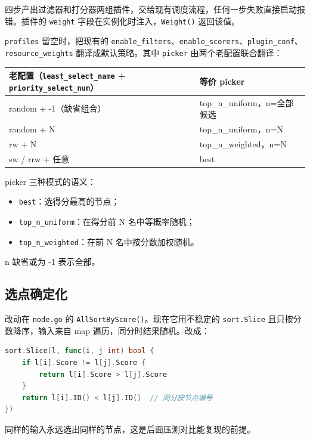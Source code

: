 \documentclass[UTF8,fontset=none,zihao=-4]{ctexart}
\newcommand{\code}[1]{\colorbox{gray!12}{\texttt{#1}}}
\begin{document}
四步产出过滤器和打分器两组插件，交给现有调度流程，任何一步失败直接启动报错。插件的 \code{weight} 字段在实例化时注入，\code{Weight()} 返回该值。

\code{profiles} 留空时，把现有的 \code{enable\_filters}、\code{enable\_scorers}、\code{plugin\_conf}、\code{resource\_weights} 翻译成默认策略。其中 \code{picker} 由两个老配置联合翻译：

\begin{table}[H]
\centering\small
\begin{tabularx}{\textwidth}{L{0.55\textwidth}L{0.45\textwidth}}
\toprule
\textbf{老配置（\code{least\_select\_name} + \code{priority\_select\_num}）} & \textbf{等价 picker} \\
\midrule
random + -1（缺省组合） & top\_n\_uniform，n=全部候选 \\
random + N & top\_n\_uniform，n=N \\
rw + N & top\_n\_weighted，n=N \\
sw / rrw + 任意 & best \\
\bottomrule
\end{tabularx}
\end{table}

picker 三种模式的语义：

\begin{itemize}
  \item \code{best}：选得分最高的节点；
  \item \code{top\_n\_uniform}：在得分前 N 名中等概率随机；
  \item \code{top\_n\_weighted}：在前 N 名中按分数加权随机。
\end{itemize}

n 缺省或为 -1 表示全部。

\subsection*{选点确定化}

改动在 \code{node.go} 的 \code{AllSortByScore()}。现在它用不稳定的 \code{sort.Slice} 且只按分数降序，输入来自 map 遍历，同分时结果随机。改成：

\begin{lstlisting}[language=go]
sort.Slice(l, func(i, j int) bool {
    if l[i].Score != l[j].Score {
        return l[i].Score > l[j].Score
    }
    return l[i].ID() < l[j].ID()  // 同分按节点编号
})
\end{lstlisting}

同样的输入永远选出同样的节点，这是后面压测对比能复现的前提。
\end{document}
